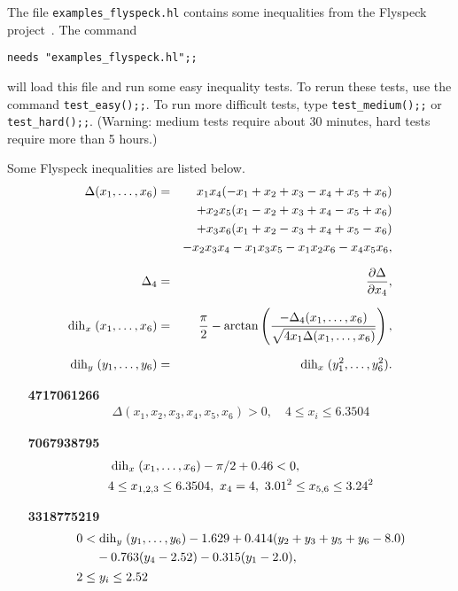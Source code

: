 \documentclass[a4paper]{article}
\newcommand{\partd}[2]{\frac{\partial #1}{\partial #2}}
\newcommand{\dih}{\mathrel{\rm dih}}
\begin{document}
The file \verb|examples_flyspeck.hl| contains some inequalities from the Flyspeck project~\cite{flyspeck}. The command

\verb|needs "examples_flyspeck.hl";;|

will load this file and run some easy inequality tests. To rerun these tests, use the command \verb|test_easy();;|. To run more difficult tests, type \verb|test_medium();;| or \verb|test_hard();;|.
(Warning: medium tests require about 30 minutes, hard tests require more than 5 hours.)

Some Flyspeck inequalities are listed below.
\begin{eqnarray*}
\Delta(x_1,\ldots,x_6) &= &x_1 x_4(-x_1 + x_2 + x_3 - x_4 + x_5 + x_6)\\
&& + x_2 x_5(x_1 - x_2 + x_3 + x_4 - x_5 + x_6)\\
&& + x_3 x_6(x_1 + x_2 - x_3 + x_4 + x_5 - x_6)\\
&& - x_2 x_3 x_4 - x_1 x_3 x_5 - x_1 x_2 x_6 - x_4 x_5 x_6,\\[6pt]
\Delta_4 &=& \partd{\Delta}{x_4},\\[6pt]
\dih_x(x_1,\ldots,x_6) &=& \frac{\pi}{2} - \arctan\left(\frac{-\Delta_4(x_1,\ldots,x_6)}{\sqrt{4 x_1 \Delta(x_1,\ldots,x_6)}}\right),\\[6pt]
\dih_y(y_1,\ldots,y_6) &=& \dih_x(y_1^2, \ldots, y_6^2).
\end{eqnarray*}

\begin{itemize}
\item[\bf 4717061266]
\begin{eqnarray*}
\Delta(x_1, x_2, x_3, x_4, x_5, x_6) > 0,\quad 4 \le x_i \le 6.3504
\end{eqnarray*}

\item[\bf 7067938795]
\begin{eqnarray*}
&\dih_x (x_1, \ldots, x_6) - \pi/2 + 0.46 < 0,\\
&4 \le x_{1,2,3} \le 6.3504,\ x_4 = 4,\ 3.01^2 \le x_{5,6} \le 3.24^2
\end{eqnarray*}

\item[\bf 3318775219]
\begin{eqnarray*}
&\begin{split}
0 < &\dih_y (y_1, \ldots, y_6) - 1.629 + 0.414 (y_2 + y_3 + y_5 + y_6 - 8.0)\\
        &- 0.763 (y_4 - 2.52) - 0.315 (y_1 - 2.0),
\end{split}\\
&2 \le y_i \le 2.52
\end{eqnarray*}

\end{itemize}
\end{document}
